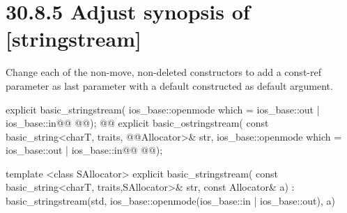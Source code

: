\documentclass[ebook,11pt,article]{memoir}
\begin{document}
\section{30.8.5 Adjust synopsis of  [stringstream]}
Change each of the non-move, non-deleted constructors to add a const-ref  parameter as last parameter with a default constructed  as default argument. 
\begin{codeblock}
explicit basic_stringstream(
             ios_base::openmode which = ios_base::out | ios_base::in@\added{,}@
             @@);
@@
explicit basic_ostringstream(
             const basic_string<charT, traits, @@Allocator>& str,
             ios_base::openmode which = ios_base::out | ios_base::in@\added{,}@
             @@);
\end{codeblock}
\begin{addedblock}\begin{codeblock}
template <class SAllocator>
explicit basic_stringstream(
             const basic_string<charT, traits,SAllocator>& str,
             const Allocator& a)
         : basic_stringstream(std, ios_base::openmode(ios_base::in | ios_base::out), a) {}
\end{codeblock}\end{addedblock}

%
\end{document}
